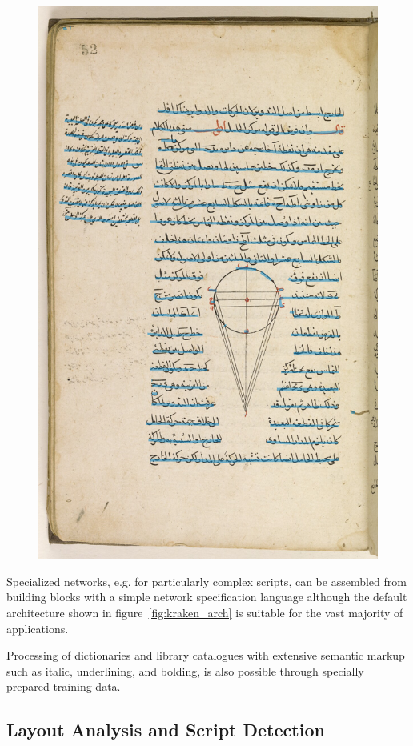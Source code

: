 \begin{figure}
	\includegraphics[width=0.8\linewidth]{88bf936743d1a444d5c0d85be2449a0d.jpg}
	\centering
	\label{fig:kraken_seg}
\end{figure}

Specialized networks, e.g. for particularly complex scripts, can be assembled
from building blocks with a simple network specification language although the
default architecture shown in figure~\ref{fig:kraken_arch} is suitable for the vast
majority of applications.

Processing of dictionaries and library catalogues with extensive semantic
markup such as italic, underlining, and bolding, is also possible through
specially prepared training data.

\subsection{Layout Analysis and Script Detection}

